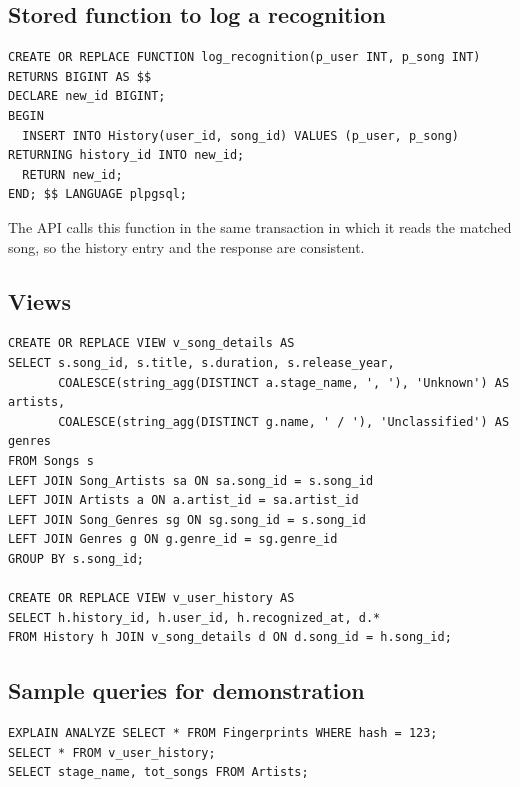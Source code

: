 \documentclass[11pt,a4paper]{article}
\begin{document}
\subsection{Stored function to log a recognition}
\begin{lstlisting}
CREATE OR REPLACE FUNCTION log_recognition(p_user INT, p_song INT) RETURNS BIGINT AS $$
DECLARE new_id BIGINT;
BEGIN
  INSERT INTO History(user_id, song_id) VALUES (p_user, p_song) RETURNING history_id INTO new_id;
  RETURN new_id;
END; $$ LANGUAGE plpgsql;
\end{lstlisting}
The API calls this function in the same transaction in which it reads the matched song, so the history entry and the response are consistent.

\subsection{Views}
\begin{lstlisting}
CREATE OR REPLACE VIEW v_song_details AS
SELECT s.song_id, s.title, s.duration, s.release_year,
       COALESCE(string_agg(DISTINCT a.stage_name, ', '), 'Unknown') AS artists,
       COALESCE(string_agg(DISTINCT g.name, ' / '), 'Unclassified') AS genres
FROM Songs s
LEFT JOIN Song_Artists sa ON sa.song_id = s.song_id
LEFT JOIN Artists a ON a.artist_id = sa.artist_id
LEFT JOIN Song_Genres sg ON sg.song_id = s.song_id
LEFT JOIN Genres g ON g.genre_id = sg.genre_id
GROUP BY s.song_id;

CREATE OR REPLACE VIEW v_user_history AS
SELECT h.history_id, h.user_id, h.recognized_at, d.*
FROM History h JOIN v_song_details d ON d.song_id = h.song_id;
\end{lstlisting}

\newpage
\subsection{Sample queries for demonstration}
\begin{lstlisting}
EXPLAIN ANALYZE SELECT * FROM Fingerprints WHERE hash = 123;
SELECT * FROM v_user_history;
SELECT stage_name, tot_songs FROM Artists;
\end{lstlisting}
\end{document}

